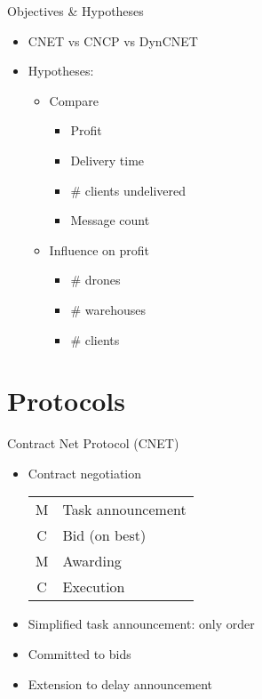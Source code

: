 \documentclass{beamer}
\begin{document}
	\begin{frame}{Objectives \& Hypotheses}
		\begin{itemize}
		\item CNET vs CNCP vs DynCNET
		\item Hypotheses:
			\begin{itemize}
			\item Compare
				\begin{itemize}
				\item Profit
				\item Delivery time
				\item \# clients undelivered
				\item Message count
				\end{itemize}
			\item Influence on profit
				\begin{itemize}
				\item \# drones
				\item \# warehouses
				\item \# clients
				\end{itemize}
			\end{itemize}
		\end{itemize}
	\end{frame}
		
	\section{Protocols}
		
	\begin{frame}{Contract Net Protocol (CNET)}
		\begin{itemize}
			\item Contract negotiation
			\linebreak			\begin{tabular}{cl}
				M & Task announcement \\
				C & Bid (on best) \\
				M & Awarding \\
				C & Execution \\
			\end{tabular}
		\end{itemize}
		
		
		\begin{itemize}			\item Simplified task announcement: only order
			\item Committed to bids
			\item Extension to delay announcement
		\end{itemize}
	\end{frame}
	
\end{document}
